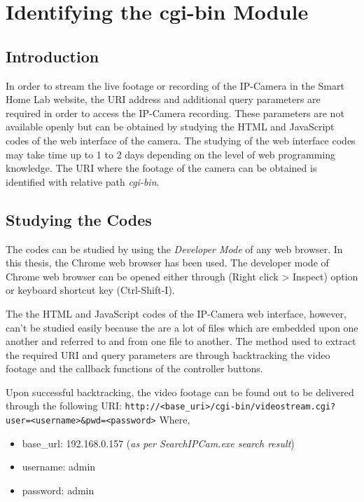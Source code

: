 \section{Identifying the cgi-bin Module}
\subsection{Introduction}
In order to stream the live footage or recording of the IP-Camera in the Smart Home Lab website, the URI address and additional query parameters are required in order to access the IP-Camera recording. These parameters are not available openly but can be obtained by studying the HTML and JavaScript codes of the web interface of the camera. The studying of the web interface codes may take time up to 1 to 2 days depending on the level of web programming knowledge. The URI where the footage of the camera can be obtained is identified with relative path \emph{cgi-bin}.

\subsection{Studying the Codes}\label{sec:cctv-studying-the-codes}
The codes can be studied by using the \emph{Developer Mode} of any web browser. In this thesis, the Chrome web browser has been used. The developer mode of Chrome web browser can be opened either through (Right click {\textgreater} Inspect) option or keyboard shortcut key (Ctrl-Shift-I).

The the HTML and JavaScript codes of the IP-Camera web interface, however, can't be studied easily because the are a lot of files which are embedded upon one another and referred to and from one file to another. The method used to extract the required URI and query parameters are through backtracking the video footage and the callback functions of the controller buttons.

Upon successful backtracking, the video footage can be found out to be delivered through the following URI:
\newline
\texttt{\footnotesize{http://\textless base\_uri\textgreater/cgi-bin/videostream.cgi?user=\textless username\textgreater\&pwd=\textless password\textgreater}}
\newline
Where,
\begin{itemize}
\item base\_url: 192.168.0.157 (\emph{as per SearchIPCam.exe search result})
\item username: admin
\item password: admin
\end{itemize}

